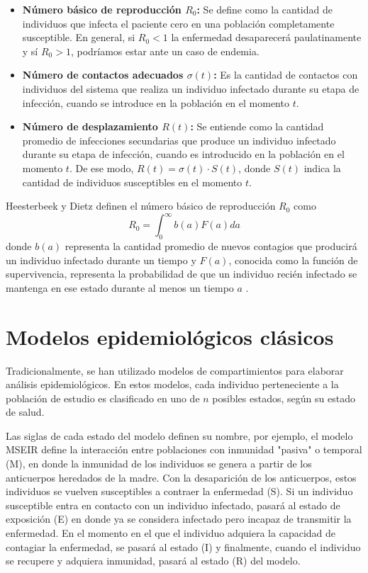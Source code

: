 \begin{itemize}
    \item \textbf{Número básico de reproducción $R_0$:} Se define como la cantidad de individuos que infecta el paciente cero en una población completamente susceptible. En general, si $R_0<1$ la enfermedad desaparecerá paulatinamente y sí $R_0>1$, podríamos estar ante un caso de endemia.
    \item \textbf{Número de contactos adecuados $\sigma(t)$:} Es la cantidad de contactos con individuos del sistema que realiza un individuo infectado durante su etapa de infección, cuando se introduce en la población en el momento $t$.
    \item \textbf{Número de desplazamiento $R(t)$:} Se entiende como la cantidad promedio de infecciones secundarias que produce un individuo infectado durante su etapa de infección, cuando es introducido en la población en el momento $t$. De ese modo, $R(t) = \sigma(t)\cdot S(t)$, donde $S(t)$ indica la cantidad de individuos susceptibles en el momento $t$.
\end{itemize}

Heesterbeek y Dietz definen el número básico de reproducción $R_0$ como
\begin{equation}\label{eq:R0}
    R_0 = \int_0^\infty b(a)F(a) da
\end{equation}
donde $b(a)$ representa la cantidad promedio de nuevos contagios que producirá un individuo infectado durante un tiempo y $F(a)$, conocida como la función de supervivencia, representa la probabilidad de que un individuo recién infectado se mantenga en ese estado durante al menos un tiempo $a$ \cite{conceptOfR0, perspectivesOnR0}.

\section{Modelos epidemiológicos clásicos}\label{sec:Modelos epidemiológicos clásicos}

Tradicionalmente, se han utilizado modelos de compartimientos para elaborar análisis epidemiológicos. En estos modelos, cada individuo perteneciente a la población de estudio es clasificado en uno de $n$ posibles estados, según su estado de salud.

Las siglas de cada estado del modelo definen su nombre, por ejemplo, el modelo MSEIR define la interacción entre poblaciones con inmunidad "pasiva" o temporal (M), en donde la inmunidad de los individuos se genera a partir de los anticuerpos heredados de la madre. Con la desaparición de los anticuerpos, estos individuos se vuelven susceptibles a contraer la enfermedad (S). Si un individuo susceptible entra en contacto con un individuo infectado, pasará al estado de exposición (E) en donde ya se considera infectado pero incapaz de transmitir la enfermedad. En el momento en el que el individuo adquiera la capacidad de contagiar la enfermedad, se pasará al estado (I) y finalmente, cuando el individuo se recupere y adquiera inmunidad, pasará al estado (R) del modelo.\cite{modelCompartimental}


